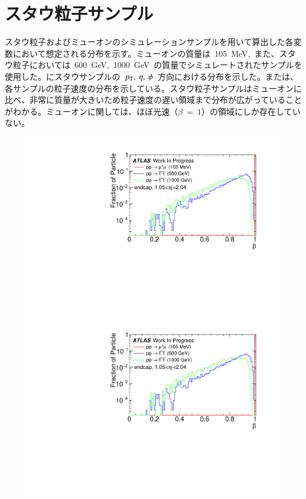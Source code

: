 \section{スタウ粒子サンプル}
スタウ粒子およびミューオンのシミュレーションサンプルを用いて算出した各変数において想定される分布を示す。ミューオンの質量は~105~MeV,~また、スタウ粒子においては~600~GeV,~1000~GeV~の質量でシミュレートされたサンプルを使用した。にスタウサンプルの~$p_{\rm{T}},~\eta,~\phi$~方向における分布を示した。または、各サンプルの粒子速度の分布を示している。スタウ粒子サンプルはミューオンに比べ、非常に質量が大きいため粒子速度の遅い領域まで分布が広がっていることがわかる。ミューオンに関しては、ほぼ光速（$\beta~=~1$）の領域にしか存在していない。

\begin{figure}[H]
    \begin{minipage}{0.49\hsize}
    \centering   
    \includegraphics[width=\textwidth,page=2]{img/plot/beta.pdf}
    \subcaption{}
    \end{minipage}
    \begin{minipage}{0.49\hsize}
    \centering   
    \includegraphics[width=\textwidth,page=3]{img/plot/beta.pdf}

\end{minipage}
\end{figure}

